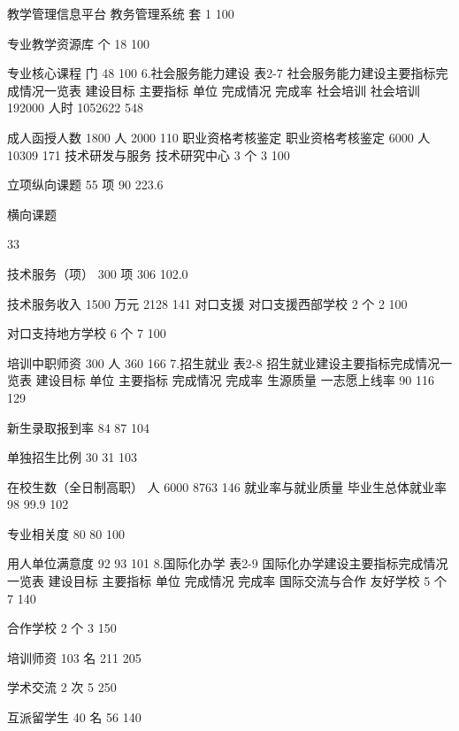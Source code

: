 教学管理信息平台
教务管理系统
套
1
100%


专业教学资源库
个
18
100%


专业核心课程
门
48
100%
6.社会服务能力建设
表2-7  社会服务能力建设主要指标完成情况一览表
建设目标
主要指标
单位
完成情况
完成率
社会培训
社会培训
192000
人时
1052622
548%

成人函授人数
1800
人
2000
110%
职业资格考核鉴定
职业资格考核鉴定
6000
人
10309
171%
技术研发与服务
技术研究中心
3
个
3
100%

立项纵向课题
55
项
90
223.6%

横向课题


33


技术服务（项）
300
项
306
102.0%

技术服务收入
1500
万元
2128
141%
对口支援
对口支援西部学校
2
个
2
100%

对口支持地方学校
6
个
7
100%

培训中职师资
300
人
360
166%
7.招生就业
表2-8   招生就业建设主要指标完成情况一览表
建设目标
单位
主要指标
完成情况
完成率
生源质量
一志愿上线率
%
90
116
129

新生录取报到率
%
84
87
104%

单独招生比例
%
30
31
103%

在校生数（全日制高职）
人
6000
8763
146%
就业率与就业质量
毕业生总体就业率
%
98
99.9
102%

专业相关度
%
80
80
100%

用人单位满意度
%
92
93
101%
8.国际化办学
表2-9  国际化办学建设主要指标完成情况一览表
建设目标
主要指标
单位
完成情况
完成率
国际交流与合作
友好学校
5
个
7
140%

合作学校
2
个
3
150%

培训师资
103
名
211
205%

学术交流
2
次
5
250%

互派留学生
40
名
56
140%

